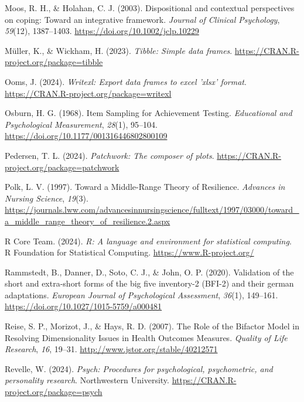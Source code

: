 \documentclass[
  man,floatsintext]{apa7}
\newlength{\cslhangindent}
\newenvironment{CSLReferences}[2] %
 {\begin{list}{}{%
  \setlength{\itemindent}{0pt}
  \setlength{\leftmargin}{0pt}
  \setlength{\parsep}{0pt}
  \ifodd #1
   \setlength{\leftmargin}{\cslhangindent}
   \setlength{\itemindent}{-1\cslhangindent}
  \fi
  \setlength{\itemsep}{#2\baselineskip}}}
 {\end{list}}
\begin{document}
\begin{CSLReferences}{1}{0}
Moos, R. H., \& Holahan, C. J. (2003). Dispositional and contextual perspectives on coping: Toward an integrative framework. \emph{Journal of Clinical Psychology}, \emph{59}(12), 1387--1403. \url{https://doi.org/10.1002/jclp.10229}

Müller, K., \& Wickham, H. (2023). \emph{Tibble: Simple data frames}. \url{https://CRAN.R-project.org/package=tibble}

Ooms, J. (2024). \emph{Writexl: Export data frames to excel 'xlsx' format}. \url{https://CRAN.R-project.org/package=writexl}

Osburn, H. G. (1968). Item {Sampling} for {Achievement} {Testing}. \emph{Educational and Psychological Measurement}, \emph{28}(1), 95--104. \url{https://doi.org/10.1177/001316446802800109}

Pedersen, T. L. (2024). \emph{Patchwork: The composer of plots}. \url{https://CRAN.R-project.org/package=patchwork}

Polk, L. V. (1997). Toward a {Middle}-{Range} {Theory} of {Resilience}. \emph{Advances in Nursing Science}, \emph{19}(3). \url{https://journals.lww.com/advancesinnursingscience/fulltext/1997/03000/toward_a_middle_range_theory_of_resilience.2.aspx}

R Core Team. (2024). \emph{R: A language and environment for statistical computing}. R Foundation for Statistical Computing. \url{https://www.R-project.org/}

Rammstedt, B., Danner, D., Soto, C. J., \& John, O. P. (2020). Validation of the short and extra-short forms of the big five inventory-2 (BFI-2) and their german adaptations. \emph{European Journal of Psychological Assessment}, \emph{36}(1), 149--161. \url{https://doi.org/10.1027/1015-5759/a000481}

Reise, S. P., Morizot, J., \& Hays, R. D. (2007). The {Role} of the {Bifactor} {Model} in {Resolving} {Dimensionality} {Issues} in {Health} {Outcomes} {Measures}. \emph{Quality of Life Research}, \emph{16}, 19--31. \url{http://www.jstor.org/stable/40212571}

Revelle, W. (2024). \emph{Psych: Procedures for psychological, psychometric, and personality research}. Northwestern University. \url{https://CRAN.R-project.org/package=psych}


\end{CSLReferences}
\end{document}
